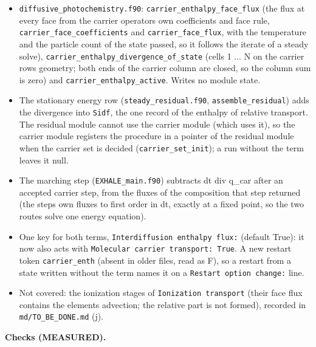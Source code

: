 \documentclass[english,a4paper]{my_memo}
\providecommand{\tightlist}{\setlength{\itemsep}{0pt}\setlength{\parskip}{0pt}}
\begin{document}
\begin{itemize}
\tightlist
\item
  \texttt{diffusive\_photochemistry.f90}: \texttt{carrier\_enthalpy\_face\_flux} (the flux at
  every face from the carrier operator\textquotesingle s own coefficients and face rule,
  \texttt{carrier\_face\_coefficients} and \texttt{carrier\_face\_flux}, with the temperature
  and the particle count of the state passed, so it follows the iterate of a
  steady solve), \texttt{carrier\_enthalpy\_divergence\_of\_state} (cells 1 ... N on the
  carrier rows\textquotesingle{} geometry; both ends of the carrier column are closed, so the
  column sum is zero) and \texttt{carrier\_enthalpy\_active}. Writes no module state.
\item
  The stationary energy row (\texttt{steady\_residual.f90}, \texttt{assemble\_residual})
  adds the divergence into \texttt{Sidf}, the one record of the enthalpy of relative
  transport. The residual module cannot use the carrier module (which uses
  it), so the carrier module registers the procedure in a pointer of the
  residual module when the carrier set is decided (\texttt{carrier\_set\_init}); a run
  without the term leaves it null.
\item
  The marching step (\texttt{EXHALE\_main.f90}) subtracts dt div q\_car after an
  accepted carrier step, from the fluxes of the composition that step
  returned (the step\textquotesingle s own fluxes to first order in dt, exactly at a fixed
  point, so the two routes solve one energy equation).
\item
  One key for both terms, \texttt{Interdiffusion\ enthalpy\ flux:} (default True): it
  now also acts with \texttt{Molecular\ carrier\ transport:\ True}. A new restart token
  \texttt{carrier\_enth} (absent in older files, read as F), so a restart from a
  state written without the term names it on a \texttt{Restart\ option\ change:}
  line.
\item
  Not covered: the ionization stages of \texttt{Ionization\ transport} (their face
  flux contains the element\textquotesingle s advection; the relative part is not formed),
  recorded in \texttt{md/TO\_BE\_DONE.md} (j).
\end{itemize}

\textbf{Checks (MEASURED).}
\end{document}
